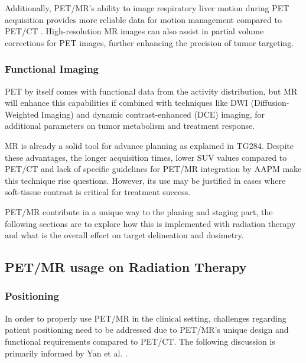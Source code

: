 \documentclass[11pt]{article} %
\begin{document}
\begin{multicols}{2}
Additionally, PET/MR’s ability to image respiratory liver motion during PET acquisition provides more reliable data for motion management compared to PET/CT \cite{knesaurek2018}. High-resolution MR images can also assist in partial volume corrections for PET images, further enhancing the precision of tumor targeting. %

\subsubsection{Functional Imaging}
PET by itself comes with functional data from the activity distribution, but MR will enhance this capabilities %
 if combined with techniques like DWI (Diffusion-Weighted Imaging) and dynamic contrast-enhanced (DCE) imaging, for additional parameters on tumor metabolism and treatment response. %

MR is already a solid tool for advance planning as explained in TG284\cite{TG284}. Despite these advantages, the longer acquisition times, lower SUV values compared to PET/CT %
and lack of specific guidelines for PET/MR integration by AAPM make this technique rise questions. However, its use may be justified in cases where soft-tissue contrast is critical for treatment success. 

PET/MR contribute in a unique way to the planing and staging part, the following sections are to explore how this is implemented with radiation therapy and what is the overall effect on target delineation and dosimetry.


\subsection{PET/MR usage on Radiation Therapy}


\subsubsection{Positioning}
In order to properly use PET/MR in the clinical setting, challenges regarding patient positioning need to be addressed due to PET/MR's  %
unique design and functional requirements compared to PET/CT. The following discussion is primarily informed by Yan et al. \cite{yan2024}.%


\end{multicols}
\end{document}
